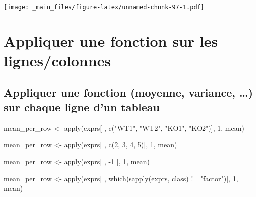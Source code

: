 \documentclass[
]{book}
\newenvironment{Shaded}{\begin{snugshade}}{\end{snugshade}}
\newcommand{\AttributeTok}[1]{\textcolor[rgb]{0.77,0.63,0.00}{#1}}
\newcommand{\DecValTok}[1]{\textcolor[rgb]{0.00,0.00,0.81}{#1}}
\newcommand{\FunctionTok}[1]{\textcolor[rgb]{0.00,0.00,0.00}{#1}}
\newcommand{\NormalTok}[1]{#1}
\newcommand{\OtherTok}[1]{\textcolor[rgb]{0.56,0.35,0.01}{#1}}
\newcommand{\SpecialCharTok}[1]{\textcolor[rgb]{0.00,0.00,0.00}{#1}}
\newcommand{\StringTok}[1]{\textcolor[rgb]{0.31,0.60,0.02}{#1}}
\begin{document}
\begin{Shaded}
\end{Shaded}

\texttt{[image: \_main\_files/figure-latex/unnamed-chunk-97-1.pdf]}

\hypertarget{appliquer-une-fonction-sur-les-lignescolonnes}{%
\section{Appliquer une fonction sur les lignes/colonnes}\label{appliquer-une-fonction-sur-les-lignescolonnes}}

\hypertarget{appliquer-une-fonction-moyenne-variance-sur-chaque-ligne-dun-tableau}{%
\subsection{Appliquer une fonction (moyenne, variance, \ldots) sur chaque ligne d'un tableau}\label{appliquer-une-fonction-moyenne-variance-sur-chaque-ligne-dun-tableau}}

\begin{Shaded}
\begin{Highlighting}[]
\NormalTok{mean\_per\_row }\OtherTok{\textless{}{-}} \FunctionTok{apply}\NormalTok{(exprs[ , }\FunctionTok{c}\NormalTok{(}\StringTok{"WT1"}\NormalTok{, }\StringTok{"WT2"}\NormalTok{, }\StringTok{"KO1"}\NormalTok{, }\StringTok{"KO2"}\NormalTok{)], }\DecValTok{1}\NormalTok{, mean)}

\NormalTok{mean\_per\_row }\OtherTok{\textless{}{-}} \FunctionTok{apply}\NormalTok{(exprs[ , }\FunctionTok{c}\NormalTok{(}\DecValTok{2}\NormalTok{, }\DecValTok{3}\NormalTok{, }\DecValTok{4}\NormalTok{, }\DecValTok{5}\NormalTok{)], }\DecValTok{1}\NormalTok{, mean)}
  
\NormalTok{mean\_per\_row }\OtherTok{\textless{}{-}} \FunctionTok{apply}\NormalTok{(exprs[ , }\SpecialCharTok{{-}}\DecValTok{1}\NormalTok{ ], }\DecValTok{1}\NormalTok{, mean)}

\NormalTok{mean\_per\_row }\OtherTok{\textless{}{-}} \FunctionTok{apply}\NormalTok{(exprs[ , }\FunctionTok{which}\NormalTok{(}\FunctionTok{sapply}\NormalTok{(exprs, class) }\SpecialCharTok{!=} \StringTok{"factor"}\NormalTok{)], }\DecValTok{1}\NormalTok{, mean)}
\end{Highlighting}
\end{Shaded}
\end{document}
